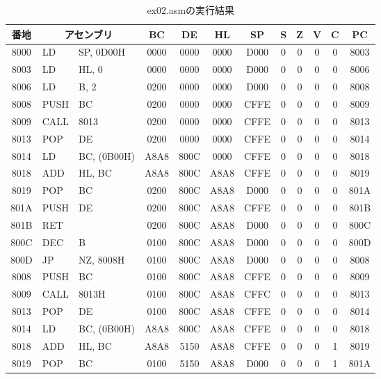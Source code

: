 \documentclass[11pt,a4j]{jsarticle}
\begin{document}
   \begin{table}[htb]
  \begin{center}
    \caption{ex02.asmの実行結果}
    \begin{tabular}{|c|ll|c|c|c|c|c|c|c|c|c|} \hline
番地 & \multicolumn{2}{|c|}{アセンブリ} & BC & DE & HL & SP & S & Z & V & C & PC \\ \hline
8000 & LD & SP, 0D00H & 0000 & 0000 & 0000 & D000 & 0 & 0 & 0 & 0 & 8003 \\ \hline
8003 & LD & HL, 0 & 0000 & 0000 & 0000 & D000 & 0 & 0 & 0 & 0 & 8006 \\ \hline
8006 & LD & B, 2 & 0200 & 0000 & 0000 & D000 & 0 & 0 & 0 & 0 & 8008 \\ \hline
8008 & PUSH & BC & 0200 & 0000 & 0000 & CFFE & 0 & 0 & 0 & 0 & 8009 \\ \hline
8009 & CALL & 8013 & 0200 & 0000 & 0000 & CFFE & 0 & 0 & 0 & 0 & 8013 \\ \hline
8013 & POP & DE & 0200 & 0000 & 0000 & CFFE & 0 & 0 & 0 & 0 & 8014 \\ \hline
8014 & LD & BC, (0B00H) & A8A8 & 800C & 0000 & CFFE & 0 & 0 & 0 & 0 & 8018 \\ \hline
8018 & ADD & HL, BC & A8A8 & 800C & A8A8 & CFFE & 0 & 0 & 0 & 0 & 8019 \\ \hline
8019 & POP & BC & 0200 & 800C & A8A8 & D000 & 0 & 0 & 0 & 0 & 801A \\ \hline
801A & PUSH & DE & 0200 & 800C &A8A8  & CFFE & 0 & 0 & 0 & 0 & 801B \\ \hline
801B & RET &  & 0200 & 800C & A8A8 & D000 & 0 & 0 & 0 & 0 & 800C \\ \hline
800C & DEC & B & 0100 & 800C & A8A8 & D000 & 0 & 0 & 0 & 0 & 800D \\ \hline
800D & JP & NZ, 8008H & 0100 & 800C & A8A8 & D000 & 0 & 0 & 0 & 0 & 8008 \\ \hline
8008 & PUSH & BC & 0100 & 800C &A8A8  & CFFE & 0 & 0 & 0 & 0 & 8009 \\ \hline
8009 & CALL & 8013H & 0100 & 800C & A8A8 & CFFC & 0 & 0 & 0 & 0 & 8013 \\ \hline
8013 & POP & DE & 0100 & 800C & A8A8 & CFFE & 0 & 0 & 0 & 0 & 8014 \\ \hline
8014 & LD & BC, (0B00H) & A8A8 & 800C &A8A8  & CFFE & 0 & 0 & 0 & 0 & 8018 \\ \hline
8018 & ADD & HL, BC & A8A8 & 5150 & A8A8 & CFFE & 0 & 0 & 0 & 1 & 8019 \\ \hline
8019 & POP & BC & 0100 & 5150 &A8A8  & D000 & 0 & 0 & 0 & 1 & 801A \\ \hline

\end{tabular}
\end{center}
\end{table}
\end{document}
